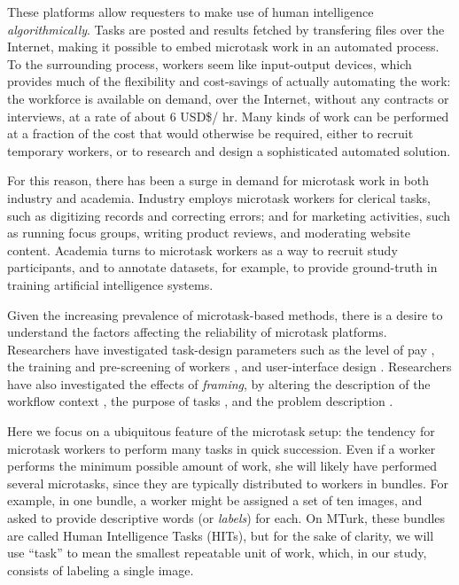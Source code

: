 \documentclass[12pt]{article}
\begin{document}
These platforms allow requesters to make use of human intelligence
\textit{algorithmically}.  Tasks are posted and results fetched by transfering
files over the Internet, making it possible to embed microtask work in an
automated process.  To the surrounding process, workers seem like 
input-output devices, which provides much of the flexibility and 
cost-savings of actually automating the work: the workforce is available
on demand, over the Internet, without any contracts or interviews, at a rate
of about 6 USD\$/ hr.  Many kinds of work can be performed at a fraction of 
the cost that would otherwise be required, either to recruit temporary 
workers, or to research and design a sophisticated automated solution.

For this reason, there has been a surge in demand for microtask work
in both industry and academia.  Industry employs microtask workers
for clerical tasks, such as digitizing records and correcting errors; 
and for marketing activities, such as running focus groups, writing product 
reviews,
and moderating website content.  Academia turns to microtask workers as 
a way to recruit study participants, and to annotate datasets, for example,
to provide ground-truth in training artificial intelligence systems.

Given the increasing prevalence of microtask-based methods, there
is a desire to understand the factors affecting the reliability of microtask
platforms.  Researchers have investigated task-design parameters such as the 
level of pay \cite{kazai2013analysis}, the training and pre-screening of 
workers \cite{le2010ensuring,paolacci2010running}, and user-interface 
design \cite{Finnerty2013}.  
Researchers have also investigated the effects of \textit{framing}, 
by altering the description of the workflow context 
\cite{Kinnaird2012281}, the purpose of tasks 
\cite{chandler2013breaking}, and the problem description
\cite{thibodeau2013natural}.  

Here we focus on a ubiquitous feature of the microtask setup: the 
tendency for microtask workers to perform many tasks in quick succession. 
Even if a worker performs the minimum possible amount of work, 
she will likely have performed several microtasks, since they are typically 
distributed to workers in bundles.  For example, in one bundle, a worker 
might be assigned a set of ten images, and asked to provide descriptive words 
(or \textit{labels}) for each.  On MTurk, these bundles are called Human 
Intelligence Tasks (HITs), but for the sake of clarity, we will use 
``task'' to mean the smallest repeatable unit of work, which, in our study, 
consists of labeling a single image.
\end{document}
